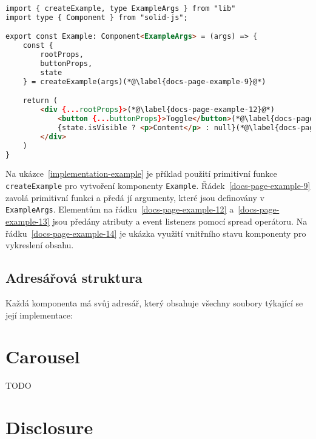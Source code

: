 \begin{lstlisting}[caption={Příklad implementace komponenty pomocí primitivní funkce}, label={implementation-example}, language=html]
import { createExample, type ExampleArgs } from "lib"
import type { Component } from "solid-js";

export const Example: Component<ExampleArgs> = (args) => {
    const {
        rootProps,
        buttonProps,
        state
    } = createExample(args)(*@\label{docs-page-example-9}@*)

    return (
        <div {...rootProps}>(*@\label{docs-page-example-12}@*)
            <button {...buttonProps}>Toggle</button>(*@\label{docs-page-example-13}@*)
            {state.isVisible ? <p>Content</p> : null}(*@\label{docs-page-example-14}@*)
        </div>
    )
}
\end{lstlisting}

Na ukázce~\ref{implementation-example} je příklad použití primitivní funkce \texttt{createExample} pro vytvoření komponenty \texttt{Example}.
Řádek~\ref{docs-page-example-9} zavolá primitivní funkci a předá jí argumenty, které jsou definovány v \texttt{ExampleArgs}.
Elementům na řádku~\ref{docs-page-example-12} a~\ref{docs-page-example-13} jsou předány atributy a event listeners pomocí spread operátoru.
Na řádku~\ref{docs-page-example-14} je ukázka využití vnitřního stavu komponenty pro vykreslení obsahu.

\subsection{Adresářová struktura}

Každá komponenta má svůj adresář, který obsahuje všechny soubory týkající se její implementace:

\vspace{11pt}


\section{Carousel}

TODO

\section{Disclosure}

